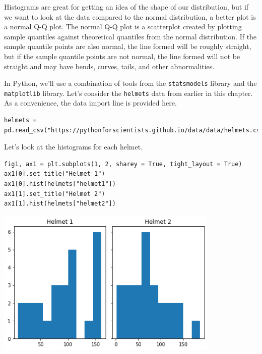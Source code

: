 Histograms are great for getting an idea of the shape of our distribution, but if we want to look at the data compared to the normal distribution, a better plot is a normal Q-Q plot. The normal Q-Q plot is a scatterplot created by plotting sample quantiles against theoretical quantiles from the normal distribution. If the sample quantile points are also normal, the line formed will be roughly straight, but if the sample quantile points are not normal, the line formed will not be straight and may have bends, curves, tails, and other abnormalities.\par
In Python, we'll use a combination of tools from the \verb|statsmodels| library and the \verb|matplotlib| library. Let's consider the \verb|helmets| data from earlier in this chapter. As a convenience, the data import line is provided here.\par
\begin{lstlisting}[style=pippython]
helmets = pd.read_csv("https://pythonforscientists.github.io/data/data/helmets.csv")
\end{lstlisting}
Let's look at the histograms for each helmet.\par
\begin{lstlisting}[style=pippython]
fig1, ax1 = plt.subplots(1, 2, sharey = True, tight_layout = True)
ax1[0].set_title("Helmet 1")
ax1[0].hist(helmets["helmet1"])
ax1[1].set_title("Helmet 2")
ax1[1].hist(helmets["helmet2"])
\end{lstlisting}

\includegraphics[width = 0.8\textwidth]{img/hist5.png}

